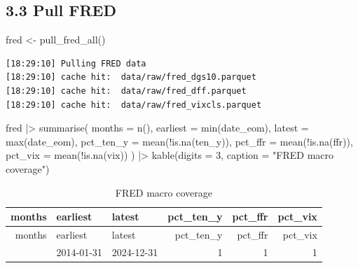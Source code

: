 \documentclass[
  letterpaper,
  DIV=11,
  numbers=noendperiod]{scrartcl}
\newenvironment{Shaded}{\begin{snugshade}}{\end{snugshade}}
\newcommand{\AttributeTok}[1]{\textcolor[rgb]{0.40,0.45,0.13}{#1}}
\newcommand{\DecValTok}[1]{\textcolor[rgb]{0.68,0.00,0.00}{#1}}
\newcommand{\FunctionTok}[1]{\textcolor[rgb]{0.28,0.35,0.67}{#1}}
\newcommand{\NormalTok}[1]{\textcolor[rgb]{0.00,0.23,0.31}{#1}}
\newcommand{\OtherTok}[1]{\textcolor[rgb]{0.00,0.23,0.31}{#1}}
\newcommand{\SpecialCharTok}[1]{\textcolor[rgb]{0.37,0.37,0.37}{#1}}
\newcommand{\StringTok}[1]{\textcolor[rgb]{0.13,0.47,0.30}{#1}}
\begin{document}
\subsection{3.3 Pull FRED}\label{pull-fred}

\begin{Shaded}
\begin{Highlighting}[]
\NormalTok{fred }\OtherTok{\textless{}{-}} \FunctionTok{pull\_fred\_all}\NormalTok{()}
\end{Highlighting}
\end{Shaded}

\begin{verbatim}
[18:29:10] Pulling FRED data
[18:29:10] cache hit:  data/raw/fred_dgs10.parquet
[18:29:10] cache hit:  data/raw/fred_dff.parquet
[18:29:10] cache hit:  data/raw/fred_vixcls.parquet
\end{verbatim}

\begin{Shaded}
\begin{Highlighting}[]
\NormalTok{fred }\SpecialCharTok{|\textgreater{}}
  \FunctionTok{summarise}\NormalTok{(}
    \AttributeTok{months =} \FunctionTok{n}\NormalTok{(),}
    \AttributeTok{earliest =} \FunctionTok{min}\NormalTok{(date\_eom),}
    \AttributeTok{latest   =} \FunctionTok{max}\NormalTok{(date\_eom),}
    \AttributeTok{pct\_ten\_y =} \FunctionTok{mean}\NormalTok{(}\SpecialCharTok{!}\FunctionTok{is.na}\NormalTok{(ten\_y)),}
    \AttributeTok{pct\_ffr   =} \FunctionTok{mean}\NormalTok{(}\SpecialCharTok{!}\FunctionTok{is.na}\NormalTok{(ffr)),}
    \AttributeTok{pct\_vix   =} \FunctionTok{mean}\NormalTok{(}\SpecialCharTok{!}\FunctionTok{is.na}\NormalTok{(vix))}
\NormalTok{  ) }\SpecialCharTok{|\textgreater{}}
  \FunctionTok{kable}\NormalTok{(}\AttributeTok{digits =} \DecValTok{3}\NormalTok{, }\AttributeTok{caption =} \StringTok{"FRED macro coverage"}\NormalTok{)}
\end{Highlighting}
\end{Shaded}

\begin{longtable}[]{@{}rllrrr@{}}
\caption{FRED macro coverage}\tabularnewline
\toprule\noalign{}
months & earliest & latest & pct\_ten\_y & pct\_ffr & pct\_vix \\
\midrule\noalign{}
\endfirsthead
\toprule\noalign{}
months & earliest & latest & pct\_ten\_y & pct\_ffr & pct\_vix \\
\midrule\noalign{}
\endhead
\bottomrule\noalign{}
\endlastfoot
132 & 2014-01-31 & 2024-12-31 & 1 & 1 & 1 \\
\end{longtable}
\end{document}

